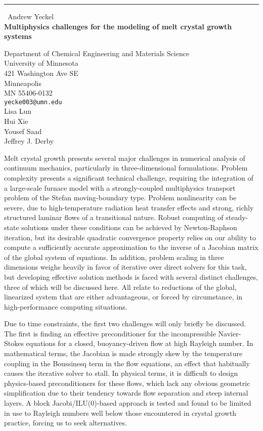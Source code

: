 \documentclass{report}
\begin{document}
\begin{center}
\rule{6in}{1pt} \
{\large Andrew Yeckel \\
{\bf Multiphysics challenges for the modeling of melt crystal growth systems}}

Department of Chemical Engineering and Materials Science \\ University of Minnesota \\ 421 Washington Ave SE \\ Minneapolis \\ MN 55406-0132
\\
{\tt yecke003@umn.edu}\\
Lisa Lun\\
Hui Xie\\
Yousef Saad\\
Jeffrey J. Derby\end{center}

Melt crystal growth presents several major challenges in numerical
analysis of continuum mechanics, particularly in three-dimensional
formulations. Problem complexity presents a significant technical
challenge, requiring the integration of a large-scale furnace model with
a strongly-coupled multiphysics transport problem of the Stefan
moving-boundary type. Problem nonlinearity can be severe, due to
high-temperature radiation heat transfer effects and strong, richly
structured laminar flows of a transitional nature. Robust computing of
steady-state solutions under these conditions can be achieved by
Newton-Raphson iteration, but its desirable quadratic convergence
property relies on our ability to compute a sufficiently accurate
approximation to the inverse of a Jacobian matrix of the global system of
equations. In addition, problem scaling in three dimensions weighs
heavily in favor of iterative over direct solvers for this task, but
developing effective solution methods is faced with several distinct
challenges, three of which will be discussed here. All relate to
reductions of the global, linearized system that are either advantageous,
or forced by circumstance, in high-performance computing situations.

Due to time constraints, the first two challenges will only briefly be
discussed. The first is finding an effective preconditioner for the
incompressible Navier-Stokes equations for a closed, buoyancy-driven flow
at high Rayleigh number. In mathematical terms, the Jacobian is made
strongly skew by the temperature coupling in the Boussinesq term in the
flow equations, an effect that habitually causes the iterative solver to
stall. In physical terms, it is difficult to design physics-based
preconditioners for these flows, which lack any obvious geometric
simplification due to their tendency towards flow separation and steep
internal layers. A block Jacobi/ILU(0)-based approach is tested and found
to be limited in use to Rayleigh numbers well below those encountered in
crystal growth practice, forcing us to seek alternatives.
\end{document}
